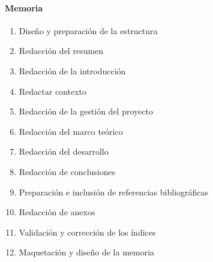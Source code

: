 \paragraph{Memoria}
\begin{enumerate}
    \item Diseño y preparación de la estructura
    \item Redacción del resumen %
    \item Redacción de la introducción %
    \item Redactar contexto %
    \item Redacción de la gestión del proyecto %
    \item Redacción del marco teórico %
    \item Redacción del desarrollo %
    \item Redacción de conclusiones %
    \item Preparación e inclusión de referencias bibliográficas %
    \item Redacción de anexos %
    \item Validación y corrección de los índices %
    \item Maquetación y diseño de la memoria %
\end{enumerate}
